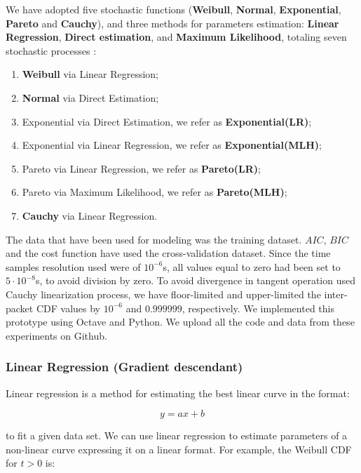 We have adopted five stochastic functions (\textbf{Weibull}, \textbf{Normal}, \textbf{Exponential}, \textbf{Pareto} and \textbf{Cauchy}), and three methods for parameters estimation: \textbf{Linear Regression}, \textbf{Direct estimation}, and \textbf{Maximum Likelihood}, totaling seven stochastic processes : 
\begin{enumerate}
\item \textbf{Weibull} via Linear Regression;
\item \textbf{Normal} via Direct Estimation;
\item Exponential via Direct Estimation, we refer as \textbf{Exponential(LR)};
\item Exponential via Linear Regression, we refer as \textbf{Exponential(MLH)};
\item Pareto via Linear Regression, we refer as \textbf{Pareto(LR)};
\item Pareto via Maximum Likelihood, we refer as \textbf{Pareto(MLH)};
\item \textbf{Cauchy} via Linear Regression.
\end{enumerate}



The data that have been used for modeling was the training dataset. $AIC$, $BIC$ and the cost function have used the cross-validation dataset. Since the time samples resolution used were of $10^{-6}$s, all values equal to zero had been set to $5\cdot10^{-8}$s, to avoid division by zero. To avoid divergence in tangent operation used  Cauchy linearization process, we have floor-limited and upper-limited the inter-packet CDF values by  $10^{-6}$ and $0.999999$, respectively. We implemented this prototype using Octave and Python. We upload all the code and data from these experiments on Github\cite{aic-bic-repo}. 


\subsubsection{Linear Regression (Gradient descendant)}


Linear regression is a method for estimating the best linear curve in the format:

\begin{equation}
y = ax + b
\end{equation}

to fit a given data set. We can use linear regression to estimate parameters of a non-linear curve expressing it on a linear format. For example, the Weibull CDF for $t > 0$ is:

